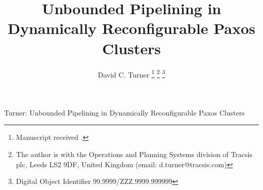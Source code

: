 \documentclass[journal]{IEEEtran}
\def\mytitle{Unbounded Pipelining in Dynamically Reconfigurable Paxos Clusters}
\begin{document}
%
\title{\mytitle}
%
%
%

\author{David C. Turner%
\thanks{Manuscript received \pubdate.}%
\thanks{The author is with the Operations and Planning Systems division of
Tracsis plc, Leeds LS2 9DF, United Kingdom (email:
d.turner@tracsis.com)}%
\thanks{Digital Object Identifier 99.9999/ZZZ.9999.999999}
}

% 
%



{Turner: \mytitle}
% 
\end{document}

